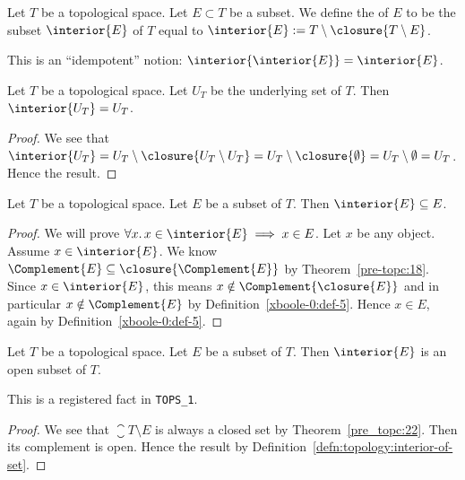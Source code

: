 \begin{definition}\label{defn:topology:interior-of-set}%
Let $T$ be a topological space. Let $E\subset T$ be a subset.
We define the  of $E$ to be the subset $\interior{E}$ of $T$ equal
to $\interior{E}:=T\setminus\closure{T\setminus E}$.

This is an ``idempotent'' notion: $\interior{\interior{E}}=\interior{E}$.
\end{definition}

\begin{theorem}
Let $T$ be a topological space. Let $U_{T}$ be the underlying set of $T$.
Then $\interior{U_{T}}=U_{T}$.
\end{theorem}

\begin{proof}
We see that $\interior{U_{T}}=U_{T}\setminus\closure{U_{T}\setminus U_{T}}=U_{T}\setminus\closure{\emptyset}=U_{T}\setminus\emptyset=U_{T}$.
Hence the result.
\end{proof}

\begin{theorem}
Let $T$ be a topological space. Let $E$ be a subset of $T$.
Then $\interior{E}\subset E$.
\end{theorem}

\begin{proof}
We will prove $\forall x\ldotp x\in\interior{E}\implies x\in E$.
Let $x$ be any object. Assume $x\in\interior{E}$. We know $\Complement{E}\subset\closure{\Complement{E}}$
by Theorem~\ref{pre-topc:18}. Since $x\in\interior{E}$, this means
$x\notin\Complement{\closure{E}}$ and in particular $x\notin\Complement{E}$
by Definition~\ref{xboole-0:def-5}.
Hence $x\in E$, again by Definition~\ref{xboole-0:def-5}.
\end{proof}

\begin{theorem}
Let $T$ be a topological space. Let $E$ be a subset of $T$.
Then $\interior{E}$ is an open subset of $T$.
\end{theorem}

This is a registered fact in \texttt{TOPS\_1}.

\begin{proof}
We see that $\closure{T\setminus E}$ is always a closed set by Theorem~\ref{pre_topc:22}.
Then its complement is open.
Hence the result by Definition~\ref{defn:topology:interior-of-set}.
\end{proof}

